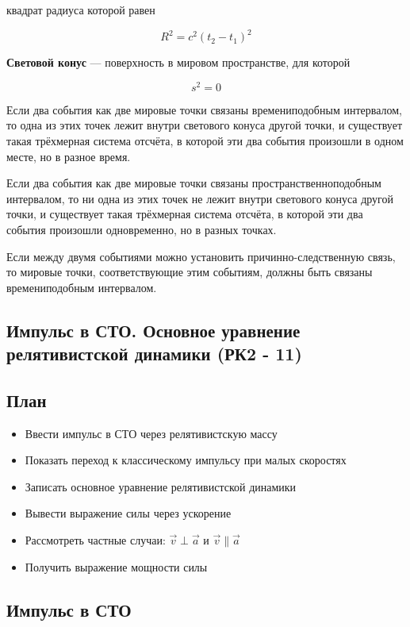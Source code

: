 \documentclass[a4paper,12pt]{article}
\begin{document}
квадрат радиуса которой равен

\[
R^2 = c^2 (t_2 - t_1)^2
\]

\begin{definitionbox}
\textbf{Световой конус} — поверхность в мировом пространстве, для которой
\end{definitionbox}

\[
s^2 = 0
\]

Если два события как две мировые точки связаны времениподобным интервалом, то одна из этих точек лежит внутри светового конуса другой точки, и существует такая трёхмерная система отсчёта, в которой эти два события произошли в одном месте, но в разное время.

Если два события как две мировые точки связаны пространственноподобным интервалом, то ни одна из этих точек не лежит внутри светового конуса другой точки, и существует такая трёхмерная система отсчёта, в которой эти два события произошли одновременно, но в разных точках.

Если между двумя событиями можно установить причинно-следственную связь, то мировые точки, соответствующие этим событиям, должны быть связаны времениподобным интервалом.

\subsection{Импульс в СТО. Основное уравнение релятивистской динамики (РК2 - 11)}

\subsection*{План}
\begin{itemize}
\item Ввести импульс в СТО через релятивистскую массу
\item Показать переход к классическому импульсу при малых скоростях
\item Записать основное уравнение релятивистской динамики
\item Вывести выражение силы через ускорение
\item Рассмотреть частные случаи: $\vec v \perp \vec a$ и $\vec v \parallel \vec a$
\item Получить выражение мощности силы
\end{itemize}

\subsection*{Импульс в СТО}
\end{document}
